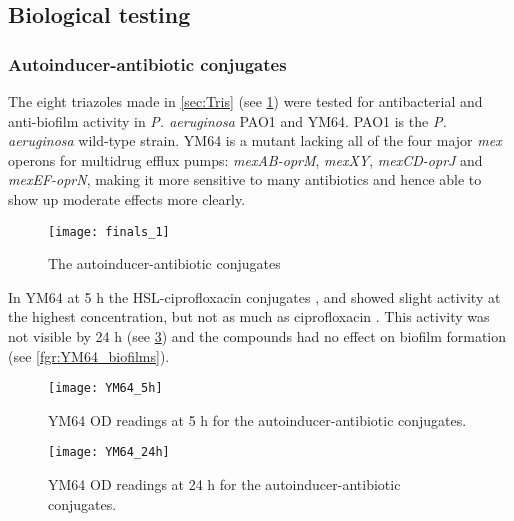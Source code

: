 \subsection{Biological testing\label{sec:bio1}}

\subsubsection{Autoinducer-antibiotic conjugates}

The eight triazoles made in \ref{sec:Tris} (see \ref{fgr:finals_1}) were tested for antibacterial and anti-biofilm activity in \textit{P. aeruginosa} PAO1\cite{Stover2000} and YM64\cite{Morita2001}.
PAO1 is the \textit{P. aeruginosa} wild-type strain.
YM64 is a mutant lacking all of the four major \textit{mex} operons for multidrug efflux pumps: \textit{mexAB-oprM}, \textit{mexXY}, \textit{mexCD-oprJ} and \textit{mexEF-oprN}, making it more sensitive to many antibiotics and hence able to show up moderate effects more clearly.

\begin{figure}[H]
	\begin{center}
		\texttt{[image: finals\_1]}
		\caption{The autoinducer-antibiotic conjugates
 		\label{fgr:finals_1}}
	\end{center}
\end{figure}

In YM64 at 5 h the HSL-ciprofloxacin conjugates ,  and  showed slight activity at the highest concentration, but not as much as ciprofloxacin .
This activity was not visible by 24 h (see \ref{fgr:YM64_24h}) and the compounds had no effect on biofilm formation (see \ref{fgr:YM64_biofilms}).



\begin{figure}[H]
	\begin{center}
		\texttt{[image: YM64\_5h]}
		\caption{YM64 OD readings at 5 h for the autoinducer-antibiotic conjugates.\label{fgr:YM64_5h}}
	\end{center}
\end{figure}
\begin{figure}[H]
	\begin{center}
		\texttt{[image: YM64\_24h]}
		\caption{YM64 OD readings at 24 h for the autoinducer-antibiotic conjugates.\label{fgr:YM64_24h}}
	\end{center}
\end{figure}

